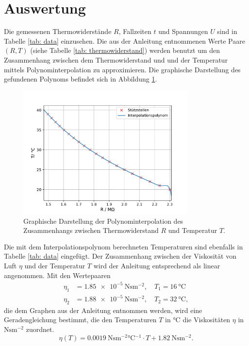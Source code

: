 \section{Auswertung}
Die gemessenen Thermowiderstände $R$, Fallzeiten $t$ und Spannungen $U$ sind in Tabelle \ref{tab: data} einzusehen.
Die aus der Anleitung entnommenen Werte Paare $(R, T)$ (siehe Tabelle \ref{tab: thermowiderstand}) werden benutzt um den Zusammenhang %
zwischen dem Thermowiderstand und und der Temperatur mittels Polynominterpolation zu approximieren. Die graphische
Darstellung des gefundenen Polynoms befindet sich in Abbildung \ref{fig: poly}.

\begin{figure}[H]
  \centering
  \includegraphics[width = 0.8\textwidth]{../Messdaten/temperature_fit.pdf}
  \caption{Graphische Darstellung der Polynominterpolation des Zusammenhangs zwischen Thermowiderstand $R$ und Temperatur $T$.}
  \label{fig: poly}
\end{figure}
 Die mit dem Interpolationspolynom berechneten
Temperaturen sind ebenfalls in Tabelle \ref{tab: data} eingefügt. Der Zusammenhang zwischen der Viskosität von Luft $\eta$ und
der Temperatur $T$ wird der Anleitung \cite{anleitung503} entsprechend als linear angenommen. Mit den Wertepaaren
\begin{align}
  \eta_1 &= \SI{1.85e-5}{\newton\second\meter^{-2}}, \quad T_1 = \SI{16}{\celsius} \\
  \eta_2 &= \SI{1.88e-5}{\newton\second\meter^{-2}}, \quad T_2 = \SI{32}{\celsius},
\end{align}
die dem Graphen aus der Anleitung entnommen werden, wird eine Geradengleichung bestimmt, die den Temperaturen
$T$ in $\si{\celsius}$ die Viskositäten $\eta$ in $\si{\newton\second\meter^{-2}}$ zuordnet.
\begin{equation}
  \eta(T) = \SI{0.0019}{\newton\second\meter^{-2} \celsius^{-1} } \cdot  T  + \SI{1.82}{\newton\second\meter^{-2}}.
\end{equation}
